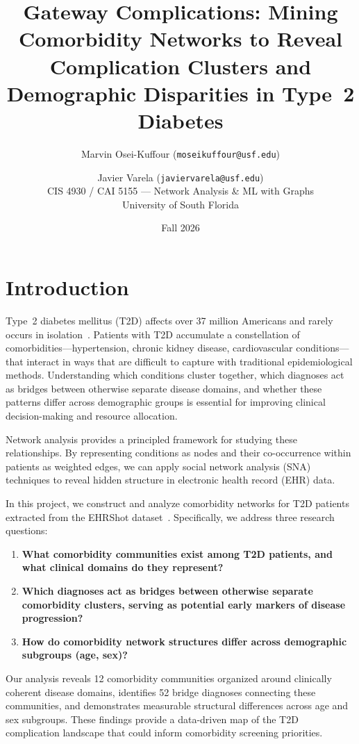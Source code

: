 \documentclass[10pt,twocolumn]{article}
\title{Gateway Complications: Mining Comorbidity Networks to Reveal\\Complication Clusters and Demographic Disparities in Type~2 Diabetes}
\author{
Marvin Osei-Kuffour (\texttt{moseikuffour@usf.edu}) \and Javier Varela (\texttt{javiervarela@usf.edu})\\
CIS 4930 / CAI 5155 --- Network Analysis \& ML with Graphs\\
University of South Florida\\
}
\date{Fall 2026}
\begin{document}
\maketitle

\section{Introduction}

Type~2 diabetes mellitus (T2D) affects over 37 million Americans and rarely occurs in isolation~\cite{barabasi2011}.
Patients with T2D accumulate a constellation of comorbidities---hypertension, chronic kidney disease, cardiovascular conditions---that interact in ways that are difficult to capture with traditional epidemiological methods.
Understanding which conditions cluster together, which diagnoses act as bridges between otherwise separate disease domains, and whether these patterns differ across demographic groups is essential for improving clinical decision-making and resource allocation.

Network analysis provides a principled framework for studying these relationships.
By representing conditions as nodes and their co-occurrence within patients as weighted edges, we can apply social network analysis (SNA) techniques to reveal hidden structure in electronic health record (EHR) data.

In this project, we construct and analyze comorbidity networks for T2D patients extracted from the EHRShot dataset~\cite{wornow2023}.
Specifically, we address three research questions:

\begin{enumerate}
    \item \textbf{What comorbidity communities exist among T2D patients, and what clinical domains do they represent?}
    \item \textbf{Which diagnoses act as bridges between otherwise separate comorbidity clusters, serving as potential early markers of disease progression?}
    \item \textbf{How do comorbidity network structures differ across demographic subgroups (age, sex)?}
\end{enumerate}

Our analysis reveals 12 comorbidity communities organized around clinically coherent disease domains, identifies 52 bridge diagnoses connecting these communities, and demonstrates measurable structural differences across age and sex subgroups.
These findings provide a data-driven map of the T2D complication landscape that could inform comorbidity screening priorities.
\end{document}
